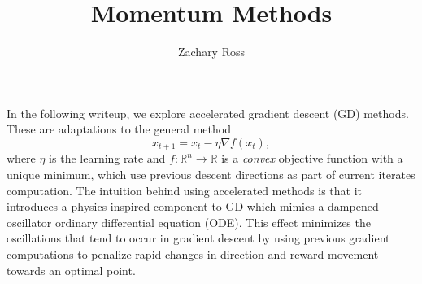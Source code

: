 \documentclass{article}
\title{Momentum Methods}
\author{Zachary Ross}
\newcommand{\R}{\mathbb R}
\begin{document}
\maketitle

In the following writeup, we explore accelerated gradient descent (GD) methods. These
are adaptations to the general method
\begin{equation}
    \label{eq:gd}
    x_{t + 1} = x_t - \eta \nabla f(x_t),
\end{equation} where $\eta$ is the learning rate and $f: \R^n \rightarrow \R$ is
a \emph{convex} objective function with a unique minimum, which use previous
descent directions as part of current iterates computation. The intuition behind
using accelerated methods is that it introduces a physics-inspired component to
GD which mimics a dampened oscillator ordinary differential equation (ODE). This
effect minimizes the oscillations that tend to occur in gradient descent by
using previous gradient computations to penalize rapid changes in direction and
reward movement towards an optimal point.
\end{document}
